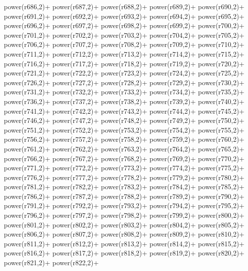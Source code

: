 \begin{DoxyCode}
{    power(r686,2)+
    power(r687,2)+
    power(r688,2)+
    power(r689,2)+
    power(r690,2)+
    power(r691,2)+
    power(r692,2)+
    power(r693,2)+
    power(r694,2)+
    power(r695,2)+
    power(r696,2)+
    power(r697,2)+
    power(r698,2)+
    power(r699,2)+
    power(r700,2)+
    power(r701,2)+
    power(r702,2)+
    power(r703,2)+
    power(r704,2)+
    power(r705,2)+
    power(r706,2)+
    power(r707,2)+
    power(r708,2)+
    power(r709,2)+
    power(r710,2)+
    power(r711,2)+
    power(r712,2)+
    power(r713,2)+
    power(r714,2)+
    power(r715,2)+
    power(r716,2)+
    power(r717,2)+
    power(r718,2)+
    power(r719,2)+
    power(r720,2)+
    power(r721,2)+
    power(r722,2)+
    power(r723,2)+
    power(r724,2)+
    power(r725,2)+
    power(r726,2)+
    power(r727,2)+
    power(r728,2)+
    power(r729,2)+
    power(r730,2)+
    power(r731,2)+
    power(r732,2)+
    power(r733,2)+
    power(r734,2)+
    power(r735,2)+
    power(r736,2)+
    power(r737,2)+
    power(r738,2)+
    power(r739,2)+
    power(r740,2)+
    power(r741,2)+
    power(r742,2)+
    power(r743,2)+
    power(r744,2)+
    power(r745,2)+
    power(r746,2)+
    power(r747,2)+
    power(r748,2)+
    power(r749,2)+
    power(r750,2)+
    power(r751,2)+
    power(r752,2)+
    power(r753,2)+
    power(r754,2)+
    power(r755,2)+
    power(r756,2)+
    power(r757,2)+
    power(r758,2)+
    power(r759,2)+
    power(r760,2)+
    power(r761,2)+
    power(r762,2)+
    power(r763,2)+
    power(r764,2)+
    power(r765,2)+
    power(r766,2)+
    power(r767,2)+
    power(r768,2)+
    power(r769,2)+
    power(r770,2)+
    power(r771,2)+
    power(r772,2)+
    power(r773,2)+
    power(r774,2)+
    power(r775,2)+
    power(r776,2)+
    power(r777,2)+
    power(r778,2)+
    power(r779,2)+
    power(r780,2)+
    power(r781,2)+
    power(r782,2)+
    power(r783,2)+
    power(r784,2)+
    power(r785,2)+
    power(r786,2)+
    power(r787,2)+
    power(r788,2)+
    power(r789,2)+
    power(r790,2)+
    power(r791,2)+
    power(r792,2)+
    power(r793,2)+
    power(r794,2)+
    power(r795,2)+
    power(r796,2)+
    power(r797,2)+
    power(r798,2)+
    power(r799,2)+
    power(r800,2)+
    power(r801,2)+
    power(r802,2)+
    power(r803,2)+
    power(r804,2)+
    power(r805,2)+
    power(r806,2)+
    power(r807,2)+
    power(r808,2)+
    power(r809,2)+
    power(r810,2)+
    power(r811,2)+
    power(r812,2)+
    power(r813,2)+
    power(r814,2)+
    power(r815,2)+
    power(r816,2)+
    power(r817,2)+
    power(r818,2)+
    power(r819,2)+
    power(r820,2)+
    power(r821,2)+
    power(r822,2)+
}
\end{DoxyCode}
